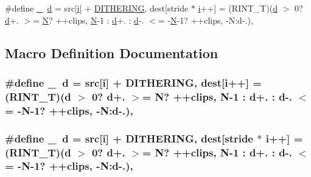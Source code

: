 \begin{DoxyCompactItemize}
\item 
\#define \hyperlink{rint-clip_8h_ae4dfd7b0d66121016d6466d2ff10e8ba}{\+\_\+}~\hyperlink{poly-fir_8h_a2530554172d8629149ec56816eeaa947}{d} = src\mbox{[}\hyperlink{checksum_8c_ab80e330a3bc9e38c1297fe17381e92b4}{i}\mbox{]} + \hyperlink{rint-clip_8h_a24bf398cdd15a6dd8f31cd2a63054b71}{D\+I\+T\+H\+E\+R\+I\+NG}, dest\mbox{[}stride $\ast$ \hyperlink{checksum_8c_ab80e330a3bc9e38c1297fe17381e92b4}{i}++\mbox{]} = (R\+I\+N\+T\+\_\+T)(\hyperlink{poly-fir_8h_a2530554172d8629149ec56816eeaa947}{d} $>$ 0? \hyperlink{poly-fir_8h_a2530554172d8629149ec56816eeaa947}{d}+. $>$= \hyperlink{rfft2d_test_m_l_8m_af6d1246b147a7c5763d9fc83082020ff}{N}? ++clips, \hyperlink{rfft2d_test_m_l_8m_af6d1246b147a7c5763d9fc83082020ff}{N}-\/1 \+: \hyperlink{poly-fir_8h_a2530554172d8629149ec56816eeaa947}{d}+. \+: \hyperlink{poly-fir_8h_a2530554172d8629149ec56816eeaa947}{d}-\/. $<$= -\/\hyperlink{rfft2d_test_m_l_8m_af6d1246b147a7c5763d9fc83082020ff}{N}-\/1? ++clips, -\/N\+:d-\/.),
\end{DoxyCompactItemize}


\subsection{Macro Definition Documentation}
\subsubsection[{\texorpdfstring{\+\_\+}{_}}]{\setlength{\rightskip}{0pt plus 5cm}\#define \+\_\+~{\bf d} = src\mbox{[}{\bf i}\mbox{]} + {\bf D\+I\+T\+H\+E\+R\+I\+NG}, dest\mbox{[}{\bf i}++\mbox{]} = (R\+I\+N\+T\+\_\+T)({\bf d} $>$ 0? {\bf d}+. $>$= {\bf N}? ++clips, {\bf N}-\/1 \+: {\bf d}+. \+: {\bf d}-\/. $<$= -\/{\bf N}-\/1? ++clips, -\/N\+:d-\/.),}\hypertarget{rint-clip_8h_ae4dfd7b0d66121016d6466d2ff10e8ba}{}\label{rint-clip_8h_ae4dfd7b0d66121016d6466d2ff10e8ba}
\subsubsection[{\texorpdfstring{\+\_\+}{_}}]{\setlength{\rightskip}{0pt plus 5cm}\#define \+\_\+~{\bf d} = src\mbox{[}{\bf i}\mbox{]} + {\bf D\+I\+T\+H\+E\+R\+I\+NG}, dest\mbox{[}stride $\ast$ {\bf i}++\mbox{]} = (R\+I\+N\+T\+\_\+T)({\bf d} $>$ 0? {\bf d}+. $>$= {\bf N}? ++clips, {\bf N}-\/1 \+: {\bf d}+. \+: {\bf d}-\/. $<$= -\/{\bf N}-\/1? ++clips, -\/N\+:d-\/.),}\hypertarget{rint-clip_8h_ae4dfd7b0d66121016d6466d2ff10e8ba}{}\label{rint-clip_8h_ae4dfd7b0d66121016d6466d2ff10e8ba}
